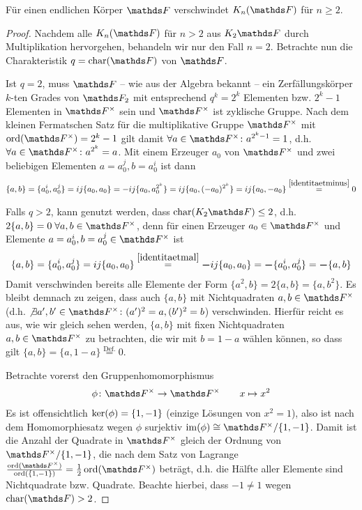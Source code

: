 \documentclass[ngerman,fontsize=11pt, paper=a4, parskip=half, titlepage=true, toc=bib]{scrartcl}
\begin{document}
\begin{Lem}
  Für einen endlichen Körper $\F$ verschwindet $\KnF$ für $n\geq 2$.
  \begin{proof}
    Nachdem alle $\KnF$ für $n>2$ aus $\K_2\F$ durch Multiplikation
    hervorgehen, behandeln wir nur den Fall $n=2$.
    Betrachte nun die Charakteristik $q=\Char(\F)$ von $\F$.

    Ist $q=2$, muss $\F$ – wie aus der Algebra bekannt – ein
    Zerfällungskörper $k$-ten Grades von $\F_2$ mit entsprechend
    $q^k=2^k$ Elementen bzw. $2^k-1$ Elementen in $\Fx$ sein und $\Fx$
    ist zyklische Gruppe.
    Nach dem kleinen Fermatschen Satz für die multiplikative Gruppe
    $\Fx$ mit $\Ord(\Fx)=2^k-1$ gilt damit $\forall a\in\Fx\colon a^{2^k-1}=1$, 
    d.h. $\forall a\in\Fx\colon a^{2^k} = a$.
    Mit einem Erzeuger $a_0$ von $\Fx$ und zwei beliebigen Elementen $a=a_0^j,
    b=a_0^i$ ist dann
    \begin{gather*}
      \{a,b\}=\{a_0^i, a_0^j\} = ij\{a_0,a_0\}
      = -ij\{a_0,a_0^{2^k}\} = ij\{a_0, (-a_0)^{2^k}\} =
      ij\{a_0,-a_0\} 
      \overset{\ref{identitaetminus}}{=} 0
    \end{gather*}

    Falls $q>2$, kann genutzt werden, dass $\Char(\K_2\F)\leq 2$, 
    d.h. $2\{a,b\}=0\;\forall a,b\in\Fx$,
    denn für einen Erzeuger $a_0\in\Fx$ und
    Elemente $a=a_0^i,b=a_0^j\in \Fx$ ist
    \begin{gather*}
      \{a,b\} = \{a_0^i,a_0^j\} = ij\{a_0,a_0\} 
      \overset{\ref{identitaetmal}}{=} \boldsymbol - ij\{a_0,a_0\}
      = \boldsymbol - \{a_0^i,a_0^j\} = \boldsymbol -\{a,b\} 
    \end{gather*}
    Damit verschwinden bereits alle Elemente der Form 
    $\{a^2,b\}=2\{a,b\}=\{a,b^2\}$. Es bleibt demnach zu zeigen, dass
    auch $\{a,b\}$ mit Nichtquadraten $a,b\in\Fx$
    (d.h. $\not\exists a',b'\in\Fx\colon (a')^2=a,(b')^2=b$)
    verschwinden.
    Hierfür reicht es aus, wie wir gleich sehen werden,
    $\{a,b\}$ mit fixen Nichtquadraten
    $a,b\in\Fx$ zu betrachten, die wir mit $b=1-a$ wählen können, 
    so dass gilt $\{a,b\}=\{a,1-a\}\overset{\text{Def.}}{=}0$.
    
    Betrachte vorerst den Gruppenhomomorphismus
    \begin{gather*}
      \phi\colon\Fx \to \Fx
      \qquad x\mapsto x^2
    \end{gather*}
    Es ist offensichtlich $\operatorname{ker}(\phi)=\{1,-1\}$ (einzige Lösungen von
    $x^2=1$), also ist nach dem Homomorphiesatz wegen $\phi$ surjektiv
    $\im(\phi)\cong \Fx/\{1,-1\}$. Damit ist die Anzahl der Quadrate
    in $\Fx$ gleich der Ordnung von $\Fx/\{1,-1\}$, die nach dem Satz
    von Lagrange
    $\frac{\Ord(\Fx)}{\Ord(\{1,-1\})}=\frac{1}{2}\Ord(\Fx)$
    beträgt, d.h. die Hälfte aller Elemente sind Nichtquadrate
    bzw. Quadrate. Beachte hierbei, dass $-1\neq 1$ wegen $\Char(\F)>2$.


\end{proof}
\end{Lem}
\end{document}
